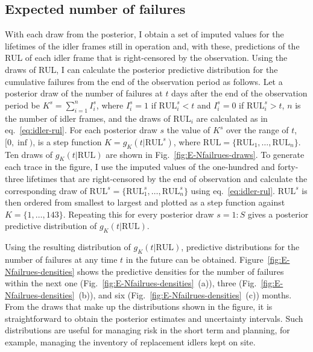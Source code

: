 \subsection{Expected number of failures} \label{subsec:idler-cumulative-failrues}

With each draw from the posterior, I obtain a set of imputed values for the lifetimes of the idler frames still in operation and, with these, predictions of the RUL of each idler frame that is right-censored by the observation. Using the draws of RUL, I can calculate the posterior predictive distribution for the cumulative failures from the end of the observation period as follows. Let a posterior draw of the number of failures at $t$ days after the end of the observation period be $K^s = \sum^{n}_{i = 1}I^s_i$, where $I^s_i = 1$ if $\text{RUL}^s_i < t$ and $I^s_i = 0$ if $\text{RUL}^s_i > t$, $n$ is the number of idler frames, and the draws of $\text{RUL}_i$ are calculated as in eq.~\eqref{eq:idler-rul}. For each posterior draw $s$ the value of $K^s$ over the range of $t$, $[0, \inf)$, is a step function $K = g_K(t|\text{RUL}^s)$, where $\text{RUL} = \{\text{RUL}_1, \dots, \text{RUL}_n\}$. Ten draws of $g_K(t|\text{RUL})$ are shown in Fig.~\ref{fig:E-Nfailrues-draws}. To generate each trace in the figure, I use the imputed values of the one-hundred and forty-three lifetimes that are right-censored by the end of observation and calculate the corresponding draw of $\text{RUL}^s = \{\text{RUL}^s_1, \dots, \text{RUL}^s_n\}$ using eq.~\eqref{eq:idler-rul}. $\text{RUL}^s$ is then ordered from smallest to largest and plotted as a step function against $K = \{1, \dots, 143\}$. Repeating this for every posterior draw $s = 1:S$ gives a posterior predictive distribution of $g_K(t|\text{RUL})$.

Using the resulting distribution of $g_K(t|\text{RUL})$, predictive distributions for the number of failures at any time $t$ in the future can be obtained. Figure~\ref{fig:E-Nfailrues-densities} shows the predictive densities for the number of failures within the next one (Fig.~\ref{fig:E-Nfailrues-densities}~(a)), three (Fig.~\ref{fig:E-Nfailrues-densities}~(b)), and six (Fig.~\ref{fig:E-Nfailrues-densities}~(c)) months. From the draws that make up the distributions shown in the figure, it is straightforward to obtain the posterior estimates and uncertainty intervals. Such distributions are useful for managing risk in the short term and planning, for example, managing the inventory of replacement idlers kept on site.

